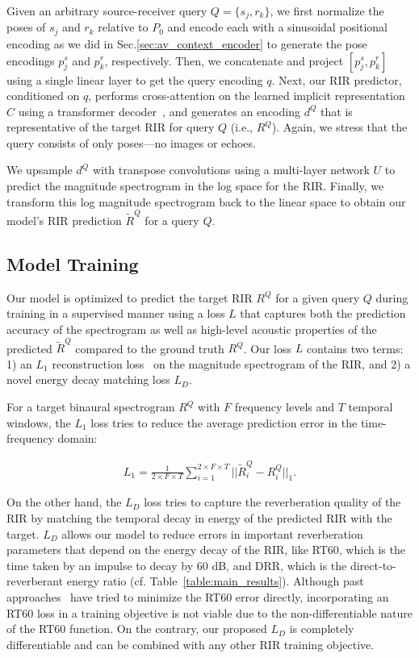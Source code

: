 Given an arbitrary source-receiver query $Q=\{s_j, r_k\}$, we first normalize the poses of $s_j$ and $r_k$ relative to $P_0$ and encode each with a sinusoidal positional encoding as we did in Sec.\ref{sec:av_context_encoder} to generate the pose encodings $p^s_j$ and $p^r_k$, respectively. Then, we concatenate and project $[p^s_j, p^r_k]$ using a single linear layer to get the query encoding $q$. Next, our RIR predictor, conditioned on $q$, performs cross-attention on the learned implicit representation $C$ using a transformer decoder~\citep{vaswani2017attention}, and generates an encoding $d^Q$ that is representative of the target RIR for query $Q$ (i.e., $R^Q$). Again, we stress that the query consists of only poses---no images or echoes.

We upsample $d^Q$ with transpose convolutions using a multi-layer network $U$ to predict the magnitude spectrogram in the log space for the RIR. Finally, we transform this log magnitude spectrogram back to the linear space to obtain our model's RIR prediction $\tilde{R}^Q$ for a query $Q$. 

\subsection{Model Training}\label{sec:model_training}

Our model is optimized to predict the target RIR $R^Q$ for a given query $Q$ during training in a supervised manner using a loss $L$ that captures both the prediction accuracy of the spectrogram as well as high-level acoustic properties of the predicted $\tilde{R}^Q$ compared to the ground truth $R^Q$. Our loss $L$ contains two terms: 1) an $L_1$ reconstruction loss~\citep{singh2021image2reverb, luo2022learning} on the magnitude spectrogram of the RIR, and 2) a novel energy decay matching loss $L_D$.

For a target binaural spectrogram $R^Q$ with $F$ frequency levels and $T$ temporal windows, the $L_1$ loss tries to reduce the average prediction error in the time-frequency domain:

\begin{align*}
L_1 = \frac{1}{2 \times F \times T}\sum_{i=1}^{2 \times F \times T}||\tilde{R}^Q_i - R^Q_i||_{1}.
\end{align*}

On the other hand, the $L_D$ loss tries to capture the reverberation quality of the RIR by matching the temporal decay in energy of the predicted RIR with the target. $L_D$ allows our model to reduce errors in important reverberation parameters that depend on the energy decay of the RIR, like RT60, which is the time taken by an impulse to decay by 60 dB, and DRR, which is the direct-to-reverberant energy ratio (cf. Table~\ref{table:main_results}). Although past approaches~\citep{singh2021image2reverb, ratnarajah2022fast} have tried to minimize the RT60 error directly, incorporating an RT60 loss in a training objective is not viable due to the non-differentiable nature of the RT60 function. On the contrary, our proposed $L_{D}$ is completely differentiable and can be combined with any other RIR training objective. 

